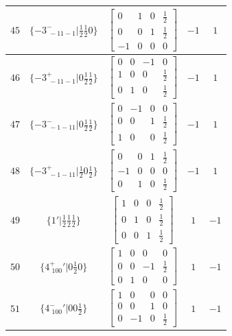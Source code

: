 \documentclass[fleqn,8pt]{jsarticle}
\begin{document}
\begin{longtable}{ccccc}
$ 45 $ & $ \{-3^{-}_{\,\,-11-1}|\frac{1}{2} \frac{1}{2} 0\} $ & $ \begin{bmatrix} 0 & 1 & 0 & \frac{1}{2} \\ 0 & 0 & 1 & \frac{1}{2} \\ -1 & 0 & 0 & 0 \end{bmatrix} $ & $ -1 $ & $ 1 $ \\ \hline
$ 46 $ & $ \{-3^{+}_{\,\,-11-1}|0 \frac{1}{2} \frac{1}{2}\} $ & $ \begin{bmatrix} 0 & 0 & -1 & 0 \\ 1 & 0 & 0 & \frac{1}{2} \\ 0 & 1 & 0 & \frac{1}{2} \end{bmatrix} $ & $ -1 $ & $ 1 $ \\ \hline
$ 47 $ & $ \{-3^{-}_{\,\,-1-11}|0 \frac{1}{2} \frac{1}{2}\} $ & $ \begin{bmatrix} 0 & -1 & 0 & 0 \\ 0 & 0 & 1 & \frac{1}{2} \\ 1 & 0 & 0 & \frac{1}{2} \end{bmatrix} $ & $ -1 $ & $ 1 $ \\ \hline
$ 48 $ & $ \{-3^{+}_{\,\,-1-11}|\frac{1}{2} 0 \frac{1}{2}\} $ & $ \begin{bmatrix} 0 & 0 & 1 & \frac{1}{2} \\ -1 & 0 & 0 & 0 \\ 0 & 1 & 0 & \frac{1}{2} \end{bmatrix} $ & $ -1 $ & $ 1 $ \\ \hline
$ 49 $ & $ \{1{}'|\frac{1}{2} \frac{1}{2} \frac{1}{2}\} $ & $ \begin{bmatrix} 1 & 0 & 0 & \frac{1}{2} \\ 0 & 1 & 0 & \frac{1}{2} \\ 0 & 0 & 1 & \frac{1}{2} \end{bmatrix} $ & $ 1 $ & $ -1 $ \\ \hline
$ 50 $ & $ \{4^{+}_{\,\,100}{}'|0 \frac{1}{2} 0\} $ & $ \begin{bmatrix} 1 & 0 & 0 & 0 \\ 0 & 0 & -1 & \frac{1}{2} \\ 0 & 1 & 0 & 0 \end{bmatrix} $ & $ 1 $ & $ -1 $ \\ \hline
$ 51 $ & $ \{4^{-}_{\,\,100}{}'|0 0 \frac{1}{2}\} $ & $ \begin{bmatrix} 1 & 0 & 0 & 0 \\ 0 & 0 & 1 & 0 \\ 0 & -1 & 0 & \frac{1}{2} \end{bmatrix} $ & $ 1 $ & $ -1 $ \\ \hline

\end{longtable}
\end{document}
